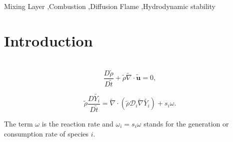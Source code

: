 \documentclass[preprint,12pt,authoryear]{elsarticle}
\begin{document}
\begin{frontmatter}
%
\begin{abstract}
\end{abstract}

\begin{keyword}
Mixing Layer  
\sep Combustion 
\sep Diffusion Flame 
\sep Hydrodynamic stability
\end{keyword}

\end{frontmatter}

\linenumbers


\section{Introduction}
%
\
\begin{equation}
 \frac{D \tilde{\rho}}{D \tilde{t}}
+\tilde{\rho} \tilde{\nabla}\cdot\tilde{\mathbf{u}}
 =0,
\label{eq:mass}  
\end{equation}

\begin{equation}
	\tilde{\rho} \frac{D  \tilde{Y_i}}{D \tilde{t}}
= 
	\tilde{\nabla}\cdot( \tilde{\rho} \mathcal{D}_i\tilde{\nabla} \tilde{Y_i})
	+
    s_i \omega.
\label{eq:specie}  
\end{equation}

The term $\omega$ is the reaction rate and 
$\omega_i = s_i \omega$ stands for the generation or consumption rate of species $i$.
\end{document}

